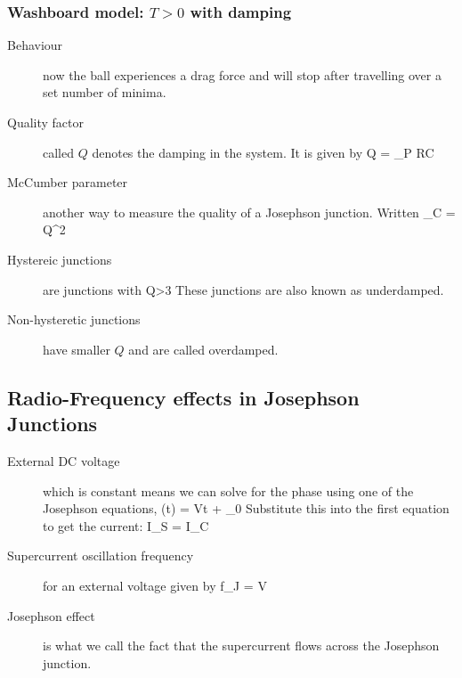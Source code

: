 \subsubsection{Washboard model: $T>0$ with damping}
\begin{description}
\item[Behaviour] now the ball experiences a drag force and will stop after travelling over a set number of minima. 

\item[Quality factor] called $Q$ denotes the damping in the system. It is given by 
\beq
Q = \omega_P RC
\eeq

\item[McCumber parameter] another way to measure the quality of a Josephson junction. Written
\beq
\beta_C = Q^2
\eeq


\item[Hystereic junctions] are junctions with 
\beq
Q>3
\eeq
These junctions are also known as underdamped. 

\item[Non-hysteretic junctions] have smaller $Q$ and are called overdamped. 



\end{description}

\subsection{Radio-Frequency effects in Josephson Junctions}
\begin{description}
\item[External DC voltage] which is constant means we can solve for the phase using one of the Josephson equations, 
\beq
\phi(t) =  Vt + \phi_0
\eeq
Substitute this into the first equation to get the current:
\beq
I_S = I_C 
\eeq

\item[Supercurrent oscillation frequency] for an external voltage given by
\beq
f_J =   V
\eeq

\item[Josephson effect] is what we call the fact that the supercurrent flows across the Josephson junction. 



\end{description}
